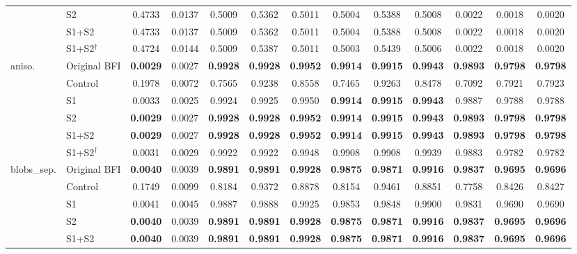 \documentclass[journal]{IEEEtran}
\begin{document}
\begin{table}[!t]
\begin{tabular}{llccccccccccc}
 & S2 & 0.4733 & 0.0137 & 0.5009 & 0.5362 & 0.5011 & 0.5004 & 0.5388 & 0.5008 & 0.0022 & 0.0018 & 0.0020 \\
 & S1+S2 & 0.4733 & 0.0137 & 0.5009 & 0.5362 & 0.5011 & 0.5004 & 0.5388 & 0.5008 & 0.0022 & 0.0018 & 0.0020 \\
 & S1+S2$^{\dagger}$ & 0.4724 & 0.0144 & 0.5009 & 0.5387 & 0.5011 & 0.5003 & 0.5439 & 0.5006 & 0.0022 & 0.0018 & 0.0020 \\
\midrule
\multirow{6}{*}{aniso.} & Original BFI & \textbf{0.0029} & 0.0027 & \textbf{0.9928} & \textbf{0.9928} & \textbf{0.9952} & \textbf{0.9914} & \textbf{0.9915} & \textbf{0.9943} & \textbf{0.9893} & \textbf{0.9798} & \textbf{0.9798} \\
 & Control & 0.1978 & 0.0072 & 0.7565 & 0.9238 & 0.8558 & 0.7465 & 0.9263 & 0.8478 & 0.7092 & 0.7921 & 0.7923 \\
 & S1 & 0.0033 & 0.0025 & 0.9924 & 0.9925 & 0.9950 & \textbf{0.9914} & \textbf{0.9915} & \textbf{0.9943} & 0.9887 & 0.9788 & 0.9788 \\
 & S2 & \textbf{0.0029} & 0.0027 & \textbf{0.9928} & \textbf{0.9928} & \textbf{0.9952} & \textbf{0.9914} & \textbf{0.9915} & \textbf{0.9943} & \textbf{0.9893} & \textbf{0.9798} & \textbf{0.9798} \\
 & S1+S2 & \textbf{0.0029} & 0.0027 & \textbf{0.9928} & \textbf{0.9928} & \textbf{0.9952} & \textbf{0.9914} & \textbf{0.9915} & \textbf{0.9943} & \textbf{0.9893} & \textbf{0.9798} & \textbf{0.9798} \\
 & S1+S2$^{\dagger}$ & 0.0031 & 0.0029 & 0.9922 & 0.9922 & 0.9948 & 0.9908 & 0.9908 & 0.9939 & 0.9883 & 0.9782 & 0.9782 \\
\midrule
\multirow{6}{*}{blobs\_sep.} & Original BFI & \textbf{0.0040} & 0.0039 & \textbf{0.9891} & \textbf{0.9891} & \textbf{0.9928} & \textbf{0.9875} & \textbf{0.9871} & \textbf{0.9916} & \textbf{0.9837} & \textbf{0.9695} & \textbf{0.9696} \\
 & Control & 0.1749 & 0.0099 & 0.8184 & 0.9372 & 0.8878 & 0.8154 & 0.9461 & 0.8851 & 0.7758 & 0.8426 & 0.8427 \\
 & S1 & 0.0041 & 0.0045 & 0.9887 & 0.9888 & 0.9925 & 0.9853 & 0.9848 & 0.9900 & 0.9831 & 0.9690 & 0.9690 \\
 & S2 & \textbf{0.0040} & 0.0039 & \textbf{0.9891} & \textbf{0.9891} & \textbf{0.9928} & \textbf{0.9875} & \textbf{0.9871} & \textbf{0.9916} & \textbf{0.9837} & \textbf{0.9695} & \textbf{0.9696} \\
 & S1+S2 & \textbf{0.0040} & 0.0039 & \textbf{0.9891} & \textbf{0.9891} & \textbf{0.9928} & \textbf{0.9875} & \textbf{0.9871} & \textbf{0.9916} & \textbf{0.9837} & \textbf{0.9695} & \textbf{0.9696} \\

\end{tabular}
\end{table}
\end{document}
